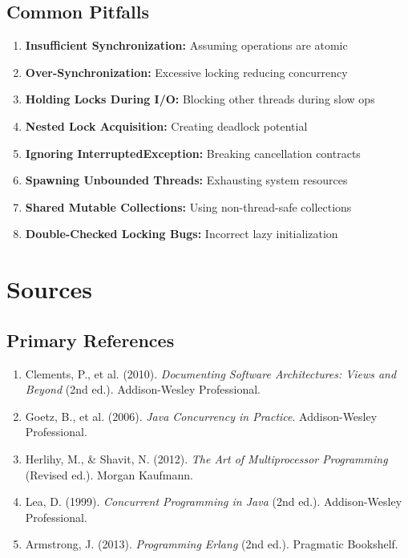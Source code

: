 \documentclass[11pt,letterpaper]{article}
\begin{document}
\subsection{Common Pitfalls}

\begin{warningbox}
\begin{enumerate}[nosep]
    \item \textbf{Insufficient Synchronization:} Assuming operations are atomic
    \item \textbf{Over-Synchronization:} Excessive locking reducing concurrency
    \item \textbf{Holding Locks During I/O:} Blocking other threads during slow ops
    \item \textbf{Nested Lock Acquisition:} Creating deadlock potential
    \item \textbf{Ignoring InterruptedException:} Breaking cancellation contracts
    \item \textbf{Spawning Unbounded Threads:} Exhausting system resources
    \item \textbf{Shared Mutable Collections:} Using non-thread-safe collections
    \item \textbf{Double-Checked Locking Bugs:} Incorrect lazy initialization
\end{enumerate}
\end{warningbox}

\section{Sources}

\subsection{Primary References}

\begin{enumerate}
    \item Clements, P., et al. (2010). \textit{Documenting Software Architectures: Views and Beyond} (2nd ed.). Addison-Wesley Professional.
    
    \item Goetz, B., et al. (2006). \textit{Java Concurrency in Practice}. Addison-Wesley Professional.
    
    \item Herlihy, M., \& Shavit, N. (2012). \textit{The Art of Multiprocessor Programming} (Revised ed.). Morgan Kaufmann.
    
    \item Lea, D. (1999). \textit{Concurrent Programming in Java} (2nd ed.). Addison-Wesley Professional.
    
    \item Armstrong, J. (2013). \textit{Programming Erlang} (2nd ed.). Pragmatic Bookshelf.
\end{enumerate}
\end{document}
